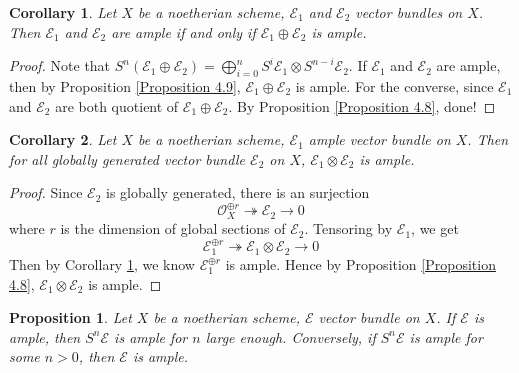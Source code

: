 \documentclass{ctexart}
\newtheorem{proposition}{Proposition}[section]
\newtheorem{corollary}{Corollary}[section]
\begin{document}
\begin{corollary}
    Let $X$ be a noetherian scheme, $\mathcal{E}_{1}$ and $\mathcal{E}_{2}$ vector bundles on $X$.
    Then $\mathcal{E}_{1}$ and $\mathcal{E}_{2}$ are ample if and only if $\mathcal{E}_{1} \oplus \mathcal{E}_{2}$ is ample.
    \label{Corollary 4.4}
\end{corollary}
\begin{proof}
    Note that $S^{n}(\mathcal{E}_{1} \oplus \mathcal{E}_{2}) = \bigoplus_{i = 0}^{n} S^{i}\mathcal{E}_{1} \otimes S^{n - i}\mathcal{E}_{2}$.
    If $\mathcal{E}_{1}$ and $\mathcal{E}_{2}$ are ample,
    then by Proposition \ref{Proposition 4.9}, $\mathcal{E}_{1} \oplus \mathcal{E}_{2}$ is ample.
    For the converse, since $\mathcal{E_{1}}$ and $\mathcal{E}_{2}$ are both quotient of $\mathcal{E}_{1} \oplus \mathcal{E}_{2}$.
    By Proposition \ref{Proposition 4.8}, done!
\end{proof}
\begin{corollary}
    Let $X$ be a noetherian scheme, $\mathcal{E}_{1}$ ample vector bundle on $X$.
    Then for all globally generated vector bundle $\mathcal{E}_{2}$ on $X$, $\mathcal{E}_{1} \otimes \mathcal{E}_{2}$ is ample.
    \label{Corollary 4.5}
\end{corollary}
\begin{proof}
    Since $\mathcal{E}_{2}$ is globally generated, there is an surjection
    \begin{equation}
        \mathcal{O}_{X}^{\oplus r} \twoheadrightarrow \mathcal{E}_{2} \rightarrow 0
    \end{equation}
    where $r$ is the dimension of global sections of $\mathcal{E}_{2}$.
    Tensoring by $\mathcal{E}_{1}$, we get
    \begin{equation}
        \mathcal{E}_{1}^{\oplus r} \twoheadrightarrow \mathcal{E}_{1} \otimes \mathcal{E}_{2} \rightarrow 0
    \end{equation}
    Then by Corollary \ref{Corollary 4.4}, we know $\mathcal{E}_{1}^{\oplus r}$ is ample.
    Hence by Proposition \ref{Proposition 4.8}, $\mathcal{E}_{1} \otimes \mathcal{E}_{2}$ is ample.
\end{proof}
\begin{proposition}
    Let $X$ be a noetherian scheme, $\mathcal{E}$ vector bundle on $X$.
    If $\mathcal{E}$ is ample, then $S^{n}\mathcal{E}$ is ample for $n$ large enough.
    Conversely, if $S^{n}\mathcal{E}$ is ample for some $n > 0$, then $\mathcal{E}$ is ample.
    \label{Proposition 4.10}
\end{proposition}
\end{document}
